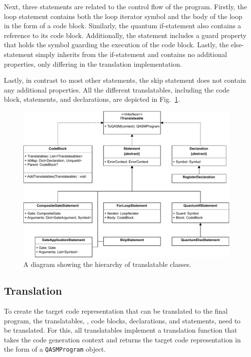 Next, three statements are related to the control flow of the program. Firstly, the loop statement contains both the loop iterator symbol and the body of the loop in the form of a code block. Similarly, the quantum if-statement also contains a reference to its code block. Additionally, the statement includes a guard property that holds the symbol guarding the execution of the code block. Lastly, the else-statement simply inherits from the if-statement and contains no additional properties, only differing in the translation implementation.

Lastly, in contrast to most other statements, the skip statement does not contain any additional properties. All the different translatables, including the code block, statements, and declarations, are depicted in Fig.~\ref{fig:implementation_uml_translatables}. 

\begin{figure}[htp]
    \centering
    \includegraphics[width=.9\textwidth]{../figures/drawio/uml_translateables.pdf}
    \caption{A diagram showing the hierarchy of translatable classes.}
    \label{fig:implementation_uml_translatables}
\end{figure}

\subsection{Translation}
\label{sec:implementation_translation}
To create the target code representation that can be translated to the final program, the translatables, \ie, code blocks, declarations, and statements, need to be translated. For this, all translatables implement a translation function that takes the code generation context and returns the target code representation in the form of a \texttt{QASMProgram} object.

